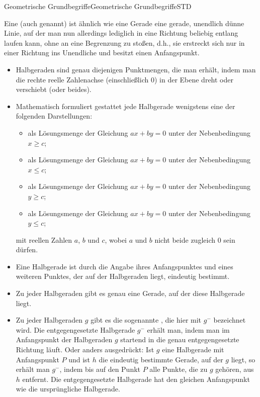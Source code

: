 \begin{MXContent}{Geometrische Grundbegriffe}{Geometrische Grundbegriffe}{STD}
\begin{MInfo}
Eine  (auch  genannt) ist \"ahnlich wie eine Gerade eine gerade, unendlich d\"unne Linie, auf der man nun allerdings lediglich in eine Richtung beliebig entlang laufen kann, ohne an eine Begrenzung zu sto\ss en, d.h., sie erstreckt sich nur in einer Richtung ins Unendliche und besitzt einen Anfangspunkt.
\begin{itemize}
 \item Halbgeraden sind genau diejenigen Punktmengen, die man erh\"alt, indem man die rechte reelle Zahlenachse (einschlie\ss lich $0$) in der Ebene dreht oder verschiebt (oder beides).
\item Mathematisch formuliert gestattet jede Halbgerade wenigstens eine der folgenden Darstellungen:
\begin{itemize}
 \item als L\"osungsmenge der Gleichung $ax+by=0$ unter der Nebenbedingung $x\geq c$;
 \item als L\"osungsmenge der Gleichung $ax+by=0$ unter der Nebenbedingung $x\leq c$;
 \item als L\"osungsmenge der Gleichung $ax+by=0$ unter der Nebenbedingung $y\geq c$;
 \item als L\"osungsmenge der Gleichung $ax+by=0$ unter der Nebenbedingung $y\leq c$;
\end{itemize}
mit reellen Zahlen $a$, $b$ und $c$, wobei $a$ und $b$ nicht beide zugleich $0$ sein d\"urfen.
 \item Eine Halbgerade ist durch die Angabe ihres Anfangspunktes und eines weiteren Punktes, der auf der Halbgeraden liegt, eindeutig bestimmt.
 \item Zu jeder Halbgeraden gibt es genau eine Gerade, auf der diese Halbgerade liegt.
 \item Zu jeder Halbgeraden $g$ gibt es die sogenannte , die hier mit $g^-$ bezeichnet wird.
Die entgegengesetzte Halbgerade $g^-$ erh\"alt man, indem man im Anfangspunkt der Halbgeraden $g$ startend in die genau entgegengesetzte Richtung l\"auft.
Oder anders ausgedr\"uckt: Ist $g$ eine Halbgerade mit Anfangspunkt $P$ und ist $h$ die eindeutig bestimmte Gerade, auf der $g$ liegt, so erh\"alt man $g^-$, indem bis auf den Punkt $P$ alle Punkte, die zu $g$ geh\"oren, aus $h$ entfernt. Die entgegengesetzte Halbgerade hat den gleichen Anfangspunkt wie die urspr\"ungliche Halbgerade.
\end{itemize}
\end{MInfo}



\end{MXContent}
